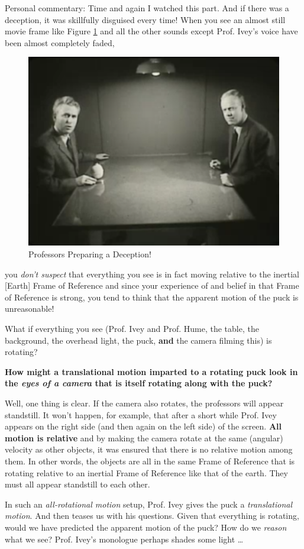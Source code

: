 \documentclass[a6paper]{article}
\newcommand{\perscom}[1]{
    {\footnotesize Personal commentary:  #1}
}
\begin{document}
\perscom{ Time and again I watched this part. And if there was a deception, it was skillfully disguised every time! When you see an almost still movie frame like Figure \ref{fig: professors-at-the-start-of-deception} and all the other sounds except Prof. Ivey's voice have been almost completely faded,
        \begin{figure}[h!]
            \centering
            \includegraphics[width=0.7\linewidth]{professors-at-the-start-of-deception.png}
            \caption{Professors Preparing a Deception!}
            \label{fig: professors-at-the-start-of-deception}
        \end{figure}
you \emph{don't suspect} that everything you see is in fact moving relative to the inertial [Earth] Frame of Reference and since your experience of and belief in that Frame of Reference is strong, you tend to think that the apparent motion of the puck is unreasonable!

What if everything you see (Prof. Ivey and Prof. Hume, the table, the background, the overhead light, the puck, \textbf{and} the camera filming this) is rotating? 

\textbf{How might a translational motion imparted to a rotating puck look in the \emph{eyes of a camera} that is itself rotating along with the puck?}

Well, one thing is clear. If the camera also rotates, the professors will appear standstill. It won't happen, for example, that after a short while Prof. Ivey appears on the right side (and then again on the left side) of the screen. \textbf{All motion is relative} and by making the camera rotate at the same (angular) velocity as other objects, it was ensured that there is no relative motion among them. In other words, the objects are all in the same Frame of Reference that is rotating relative to an inertial Frame of Reference like that of the earth. They must all appear standstill to each other.

In such an \emph{all-rotational motion} setup, Prof. Ivey gives the puck a \emph{translational motion}. And then teases us with his questions. Given that everything is rotating, would we have predicted the apparent motion of the puck? How do we \emph{reason} what we see? Prof. Ivey's monologue perhaps shades some light \dots
}
\end{document}
